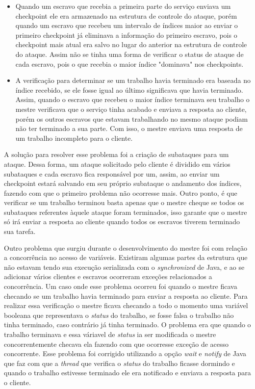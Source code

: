 \documentclass[
	12pt,				%
    oneside,			%
	a4paper,			%
	english,			%
	brazil,				%
	]{abntex2}
\begin{document}
\begin{itemize}

	\item Quando um escravo que recebia a primeira parte do serviço enviava um checkpoint ele era armazenado na estrutura de controle do ataque, porém quando um escravo que recebeu um intervalo de índices maior ao enviar o primeiro checkpoint já eliminava a informação do primeiro escravo, pois o checkpoint mais atual era salvo no lugar do anterior na estrutura de controle do ataque. Assim não se tinha uma forma de verificar o status de ataque de cada escravo, pois o que recebia o maior índice "dominava" nos checkpoints.

	\item A verificação para determinar se um trabalho havia terminado era baseada no índice recebido, se ele fosse igual ao último significava que havia terminado. Assim, quando o escravo que recebeu o maior índice terminava seu trabalho o mestre 
verificava que o serviço tinha acabado e enviava a resposta ao cliente, porém os outros escravos que estavam trabalhando no
mesmo ataque podiam não ter terminado a sua parte. Com isso, o mestre enviava uma resposta de um trabalho incompleto para o cliente.

\end{itemize}

A solução para resolver esse problema foi a criação de subataques para um ataque. Dessa forma, um ataque solicitado pelo cliente é dividido em vários subataques e cada escravo fica responsável por um, assim, ao enviar um checkpoint estará salvando em seu próprio subataque o andamento dos índices, fazendo com que o primeiro problema não ocorresse mais. Outro ponto, é que verificar se um trabalho terminou basta apenas que o mestre cheque se todos os subataques referentes àquele ataque foram terminados, isso garante que o mestre só irá enviar a resposta ao cliente quando todos os escravos tiverem terminado sua tarefa.

Outro problema que surgiu durante o desenvolvimento do mestre foi com relação a concorrência no acesso de variáveis. Existiram
algumas partes da estrutura que não estavam tendo sua execução serializada com o \textit{synchronized} de Java, e ao se adicionar vários clientes e escravos ocorreram exceções relacionados a concorrência. Um caso onde esse problema ocorreu foi quando o mestre ficava checando se um trabalho havia terminado para enviar a resposta ao cliente. Para realizar essa verificação o mestre ficava checando a todo o momento uma variável booleana que representava o \textit{status} do trabalho, se fosse falsa o trabalho não tinha terminado, caso contrário já tinha terminado. O problema era que quando o trabalho terminava e essa váriavel de \textit{status} ia ser modificada o mestre concorrentemente checava ela fazendo com que ocorresse exceção de acesso concorrente. Esse problema foi corrigido utilizando a opção \textit{wait} e \textit{notify} de Java que faz com que a \textit{thread} que verifica o \textit{status} do trabalho ficasse dormindo e quando o trabalho estivesse terminado ele era notificado e enviava a resposta para o cliente.
\end{document}
